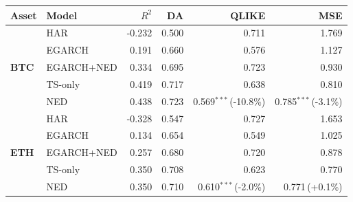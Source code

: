\begin{tabular}{llrrrr}
\toprule
Asset & Model & $R^2$ & DA & QLIKE & MSE \\
\midrule
\multirow{5}{*}{\textbf{BTC}} & HAR & -0.232 & 0.500 & 0.711 & 1.769 \\
 & EGARCH & 0.191 & 0.660 & 0.576 & 1.127 \\
 & EGARCH+NED & 0.334 & 0.695 & 0.723 & 0.930 \\
 & TS-only & 0.419 & 0.717 & 0.638 & 0.810 \\
 & NED & 0.438 & 0.723 & 0.569$^{***}$\,(-10.8\%) & 0.785$^{***}$\,(-3.1\%) \\
\midrule
\multirow{5}{*}{\textbf{ETH}} & HAR & -0.328 & 0.547 & 0.727 & 1.653 \\
 & EGARCH & 0.134 & 0.654 & 0.549 & 1.025 \\
 & EGARCH+NED & 0.257 & 0.680 & 0.720 & 0.878 \\
 & TS-only & 0.350 & 0.708 & 0.623 & 0.770 \\
 & NED & 0.350 & 0.710 & 0.610$^{***}$\,(-2.0\%) & 0.771\,(+0.1\%) \\
\bottomrule
\end{tabular}
